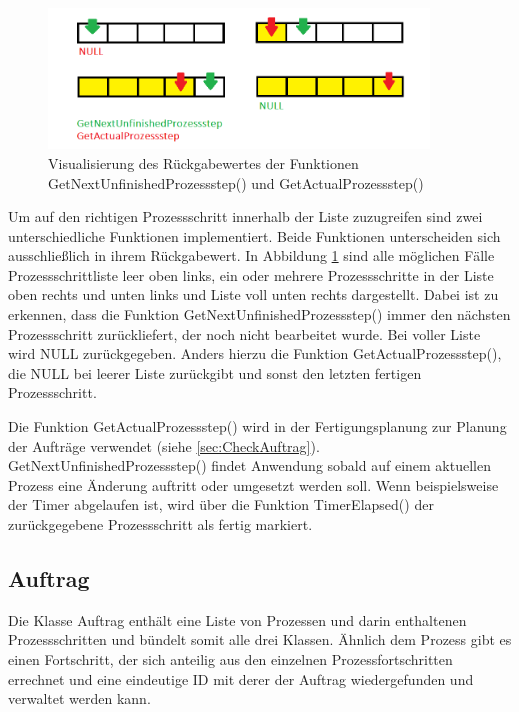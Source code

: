 \begin{figure}[htb]
    \centering
    \includegraphics[width=0.9\textwidth]{Abbildungen/GetProzessstep.PNG}
    \caption{Visualisierung des Rückgabewertes der Funktionen GetNextUnfinishedProzessstep() und GetActualProzessstep()}		
    \label{fig:GetProzessstepFunktionen}
\end{figure}

Um auf den richtigen Prozessschritt innerhalb der Liste zuzugreifen sind zwei unterschiedliche Funktionen implementiert. Beide Funktionen unterscheiden sich ausschließlich in ihrem Rückgabewert. In Abbildung \ref{fig:GetProzessstepFunktionen} sind alle möglichen Fälle Prozessschrittliste leer oben links, ein oder mehrere Prozessschritte in der Liste oben rechts und unten links und Liste voll unten rechts dargestellt. Dabei ist zu erkennen, dass die Funktion GetNextUnfinishedProzessstep() immer den nächsten Prozessschritt zurückliefert, der noch nicht bearbeitet wurde. Bei voller Liste wird NULL zurückgegeben. Anders hierzu die Funktion GetActualProzessstep(), die NULL bei leerer Liste zurückgibt und sonst den letzten fertigen Prozessschritt. 

Die Funktion GetActualProzessstep() wird in der Fertigungsplanung zur Planung der Aufträge verwendet (siehe \ref{sec:CheckAuftrag}). GetNextUnfinishedProzessstep() findet Anwendung sobald auf einem aktuellen Prozess eine Änderung auftritt oder umgesetzt werden soll. Wenn beispielsweise der Timer abgelaufen ist, wird über die Funktion TimerElapsed() der zurückgegebene Prozessschritt als fertig markiert.

\subsection{Auftrag}
\label{sec:Auftrag}

Die Klasse Auftrag enthält eine Liste von Prozessen und darin enthaltenen Prozessschritten und bündelt somit alle drei Klassen. Ähnlich dem Prozess gibt es einen Fortschritt, der sich anteilig aus den einzelnen Prozessfortschritten errechnet und eine eindeutige ID mit derer der Auftrag wiedergefunden und verwaltet werden kann. 

